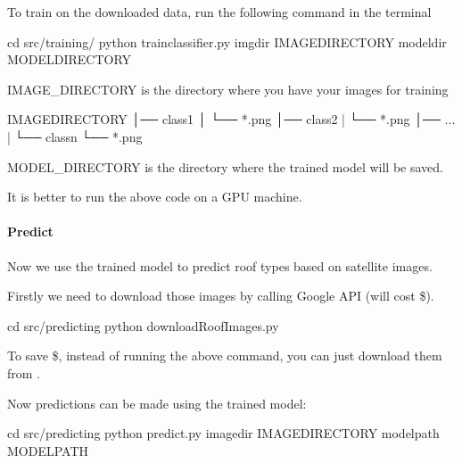 \documentclass[letterpaper,10pt,english]{sphinxmanual}
\begin{document}
\sphinxAtStartPar
To train on the downloaded data, run the following command in the terminal

\begin{sphinxVerbatim}[commandchars=\\\{\}]
cd src/training/
python train\PYGZus{}classifier.py \PYGZhy{}\PYGZhy{}img\PYGZus{}dir \PYGZlt{}IMAGE\PYGZus{}DIRECTORY\PYGZgt{} \PYGZhy{}\PYGZhy{}model\PYGZus{}dir \PYGZlt{}MODEL\PYGZus{}DIRECTORY\PYGZgt{}
\end{sphinxVerbatim}

\sphinxAtStartPar
IMAGE\_DIRECTORY is the directory where you have your images for training

\begin{sphinxVerbatim}[commandchars=\\\{\}]
IMAGE\PYGZus{}DIRECTORY
│── class\PYGZus{}1
│       └── *.png
│── class\PYGZus{}2
|      └── *.png
│── ...
|
└── class\PYGZus{}n
       └── *.png
\end{sphinxVerbatim}

\sphinxAtStartPar
MODEL\_DIRECTORY is the directory where the trained model will be saved.

\sphinxAtStartPar
It is better to run the above code on a GPU machine.


\paragraph{Predict}
\label{\detokenize{common/user_manual/train:predict}}
\sphinxAtStartPar
Now we use the trained model to predict roof types based on satellite images.

\sphinxAtStartPar
Firstly we need to download those images by calling Google API (will cost \$).

\begin{sphinxVerbatim}[commandchars=\\\{\}]
cd src/predicting
python downloadRoofImages.py
\end{sphinxVerbatim}

\sphinxAtStartPar
To save \$, instead of running the above command, you can just download them from
.

\sphinxAtStartPar
Now predictions can be made using the trained model:

\begin{sphinxVerbatim}[commandchars=\\\{\}]
cd src/predicting
python predict.py \PYGZhy{}\PYGZhy{}image\PYGZus{}dir \PYGZlt{}IMAGE\PYGZus{}DIRECTORY\PYGZgt{} \PYGZhy{}\PYGZhy{}model\PYGZus{}path \PYGZlt{}MODEL\PYGZus{}PATH\PYGZgt{}
\end{sphinxVerbatim}
\end{document}
